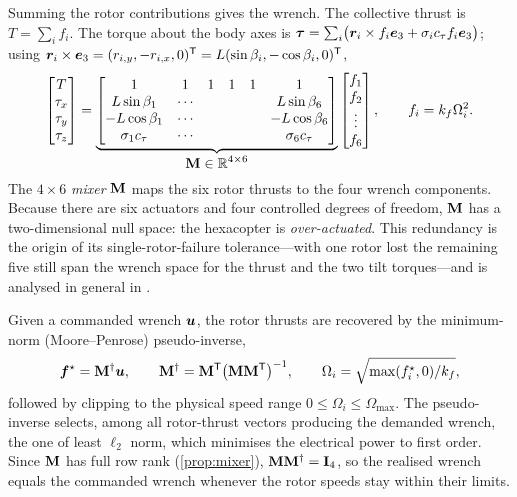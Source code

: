 Summing the rotor contributions gives the wrench. The collective thrust is
$T=\sum_i f_i$. The torque about the body axes is
$\bm{\tau}=\sum_i\bigl(\bm{r}_i\times f_i\bm{e}_3+\sigma_i c_\tau f_i\bm{e}_3\bigr)$;
using $\bm{r}_i\times\bm{e}_3=(r_{i,y},-r_{i,x},0)^{\mathsf{T}}=L(\sin\beta_i,-\cos\beta_i,0)^{\mathsf{T}}$,
\begin{equation}
\begin{bmatrix} T\\ \tau_x\\ \tau_y\\ \tau_z\end{bmatrix}
=\underbrace{\begin{bmatrix}
1 & 1 & 1 & 1 & 1 & 1\\
L\sin\beta_1 & \cdots & & & & L\sin\beta_6\\
-L\cos\beta_1 & \cdots & & & & -L\cos\beta_6\\
\sigma_1 c_\tau & \cdots & & & & \sigma_6 c_\tau
\end{bmatrix}}_{\displaystyle \mathbf{M}\in\mathbb{R}^{4\times6}}
\begin{bmatrix} f_1\\ f_2\\ \vdots\\ f_6\end{bmatrix},
\qquad f_i=k_f\Omega_i^2.
\label{eq:mixer}
\end{equation}
The $4\times6$ \emph{mixer} $\mathbf{M}$ maps the six rotor thrusts to the four
wrench components. Because there are six actuators and four controlled degrees of
freedom, $\mathbf{M}$ has a two-dimensional null space: the hexacopter is
\emph{over-actuated}. This redundancy is the origin of its single-rotor-failure
tolerance---with one rotor lost the remaining five still span the wrench space
for the thrust and the two tilt torques---and is analysed in general in
\cite{michieletto2018fundamental}.

Given a commanded wrench $\bm{u}$, the rotor thrusts are recovered by the
minimum-norm (Moore--Penrose) pseudo-inverse,
\begin{equation}
\bm{f}^{\star}=\mathbf{M}^{\dagger}\bm{u},
\qquad
\mathbf{M}^{\dagger}=\mathbf{M}^{\mathsf{T}}\bigl(\mathbf{M}\mathbf{M}^{\mathsf{T}}\bigr)^{-1},
\qquad
\Omega_i=\sqrt{\max(f_i^{\star},0)/k_f},
\label{eq:mixer-inv}
\end{equation}
followed by clipping to the physical speed range $0\le\Omega_i\le\Omega_{\max}$.
The pseudo-inverse selects, among all rotor-thrust vectors producing the demanded
wrench, the one of least $\ell_2$ norm, which minimises the electrical power to
first order. Since $\mathbf{M}$ has full row rank (\cref{prop:mixer}),
$\mathbf{M}\mathbf{M}^{\dagger}=\mathbf{I}_4$, so the realised wrench equals the commanded
wrench whenever the rotor speeds stay within their limits.

